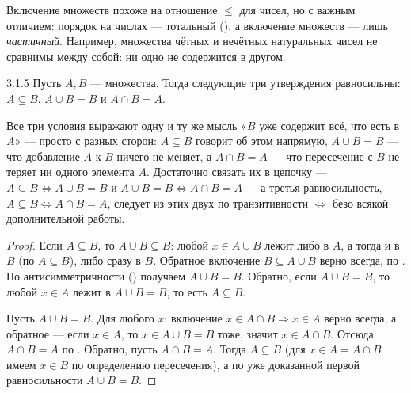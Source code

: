 \begin{remark}
Включение множеств похоже на отношение $\leq$ для чисел, но с важным отличием: порядок на
числах — тотальный (), а включение множеств — лишь
\emph{частичный}. Например, множества чётных и нечётных натуральных чисел не сравнимы между
собой: ни одно не содержится в другом.
\end{remark}

\begin{exercise}{3.1.5}{}
Пусть $A,B$ — множества. Тогда следующие три утверждения равносильны: $A \subseteq B$,
$A \cup B = B$ и $A \cap B = A$.
\end{exercise}

\begin{intuition}
Все три условия выражают одну и ту же мысль «$B$ уже содержит всё, что есть в $A$» —
просто с разных сторон: $A \subseteq B$ говорит об этом напрямую, $A \cup B = B$ — что
добавление $A$ к $B$ ничего не меняет, а $A \cap B = A$ — что пересечение с $B$ не теряет
ни одного элемента $A$. Достаточно связать их в цепочку — $A \subseteq B \iff A \cup B = B$
и $A \cup B = B \iff A \cap B = A$ — а третья равносильность,
$A \subseteq B \iff A \cap B = A$, следует из этих двух по транзитивности $\iff$ безо
всякой дополнительной работы.
\end{intuition}

\begin{proof}
 Если $A \subseteq B$, то $A \cup B \subseteq B$:
любой $x \in A \cup B$ лежит либо в $A$, а тогда и в $B$ (по $A \subseteq B$), либо сразу в
$B$. Обратное включение $B \subseteq A \cup B$ верно всегда, по .
По антисимметричности () получаем $A \cup B = B$.
Обратно, если $A \cup B = B$, то любой $x \in A$ лежит в $A \cup B = B$, то есть $A \subseteq B$.

 Пусть $A \cup B = B$. Для любого $x$:
включение $x \in A \cap B \Rightarrow x \in A$ верно всегда, а обратное — если $x \in A$, то
$x \in A \cup B = B$ тоже, значит $x \in A \cap B$. Отсюда $A \cap B = A$ по
. Обратно, пусть $A \cap B = A$. Тогда $A \subseteq B$ (для
$x \in A = A \cap B$ имеем $x \in B$ по определению пересечения), а по уже доказанной первой
равносильности $A \cup B = B$.
\end{proof}

